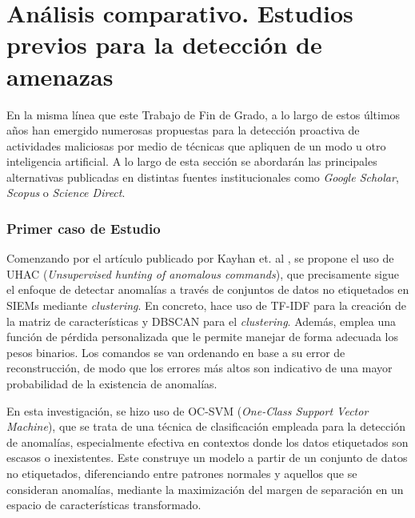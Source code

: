 
\section[Estudios previos para la detección de amenazas]{Análisis comparativo. Estudios previos para la detección de amenazas}

En la misma línea que este Trabajo de Fin de Grado, a lo largo de estos últimos años han emergido numerosas propuestas para la detección proactiva de actividades maliciosas por medio de técnicas que apliquen de un modo u otro inteligencia artificial. A lo largo de esta sección se abordarán las principales alternativas publicadas en distintas fuentes institucionales como \textit{Google Scholar}, \textit{Scopus} o \textit{Science Direct}. \\


\subsubsection*{Primer caso de Estudio}

Comenzando por el artículo publicado por Kayhan et. al \cite{KAYHAN2023113928}, se propone el uso de \gls{UHAC} (\textit{Unsupervised hunting of anomalous commands}), que precisamente sigue el enfoque de detectar anomalías a través de conjuntos de datos no etiquetados en \gls{SIEM}s mediante \textit{clustering}. En concreto, hace uso de \gls{TF}-\gls{IDF} para la creación de la matriz de características y \gls{DBSCAN} para el \textit{clustering}. Además, emplea una función de pérdida personalizada que le permite manejar de forma adecuada los pesos binarios\footnotemark. Los comandos se van ordenando en base a su error de reconstrucción, de modo que los errores más altos son indicativo de una mayor probabilidad de la existencia de anomalías. 


En esta investigación, se hizo uso de \gls{OC-SVM} (\textit{One-Class Support Vector Machine}), que se trata de una técnica de clasificación empleada para la detección de anomalías, especialmente efectiva en contextos donde los datos etiquetados son escasos o inexistentes. Este construye un modelo a partir de un conjunto de datos no etiquetados, diferenciando entre patrones normales y aquellos que se consideran anomalías, mediante la maximización del margen de separación en un espacio de características transformado.


